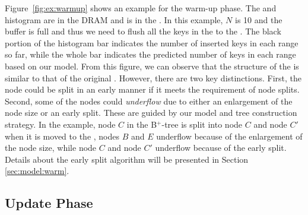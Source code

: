 Figure~\ref{fig:ex:warmup} shows an
example for the warm-up phase.
The \bplustree and histogram are in the DRAM and \bptree is in the \pcm.
In this example,
$N$ is 10 and the buffer is full and
thus we need to flush all the keys in the \bplustree to the \pcm.
The black portion of the histogram bar indicates the
number of inserted keys in each range so far, while
the whole bar indicates the predicted number of keys in each range
based on our \predict model.
From this figure,
we can observe that the structure of the \bptree is similar
to that of the original \bplustree.
However, there are two key distinctions.
First, the node could be split in an early manner
if it meets the requirement of node splits.
Second, some of the nodes could \emph{underflow}
due to either an enlargement of the node size or an early split.
These are guided by our \predict model and tree construction strategy.
In the example,
node $C$ in the B$^+$-tree is split into node $C$
and node $C'$ when it is moved to the \bptree,
nodes $B$ and $E$ underflow because of the enlargement of the node size,
while node $C$ and node $C'$ underflow because of the early split.
Details about the early split algorithm
will be presented in Section \ref{sec:model:warm}.






\subsection{Update Phase}\label{sec:build}

